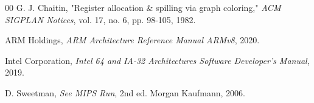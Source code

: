 \documentclass[conference,10pt,twocolumn]{IEEEtran}
\begin{document}
\begin{thebibliography}{00}
 G. J. Chaitin, "Register allocation \& spilling via graph coloring," \emph{ACM SIGPLAN Notices}, vol. 17, no. 6, pp. 98-105, 1982.

 ARM Holdings, \emph{ARM Architecture Reference Manual ARMv8}, 2020.

 Intel Corporation, \emph{Intel 64 and IA-32 Architectures Software Developer's Manual}, 2019.

 D. Sweetman, \emph{See MIPS Run}, 2nd ed. Morgan Kaufmann, 2006.

\end{thebibliography}
\end{document}
